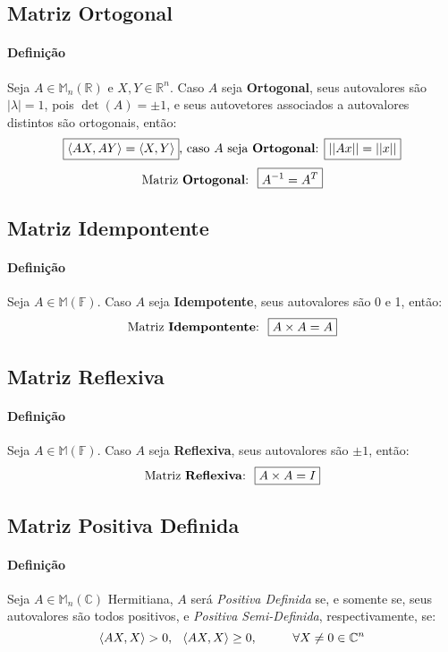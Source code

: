 \documentclass{article}
\begin{document}
        \subsection{Matriz Ortogonal}
            \paragraph{Definição}Seja $A\in\mathbb{M}_{n}(\mathbb{R})$ e $X, Y \in\mathbb{R}^{n}$. Caso $A$ seja \textbf{Ortogonal}, seus autovalores são $|\lambda| = 1$, pois $\det(A) = \pm 1$, e seus autovetores associados a autovalores distintos são ortogonais, então:
            \[
                \boxed{\langle AX, AY \rangle = \langle X, Y \rangle} \text{, caso $A$ seja \textbf{Ortogonal}: }
                \boxed{||Ax|| = ||x||}
            \]
            \[\text{Matriz \textbf{Ortogonal}:} \hspace{2.5mm} \boxed{A^{-1} = A^{T}}\]

        \subsection{Matriz Idempontente}
            \paragraph{Definição}Seja $A\in\mathbb{M}(\mathbb{F})$. Caso $A$ seja \textbf{Idempotente}, seus autovalores são 0 e 1, então:
                \[\text{Matriz \textbf{Idempontente}:} \hspace{2.5mm} \boxed{A \times A = A}\]

        \subsection{Matriz Reflexiva}
            \paragraph{Definição}Seja $A\in\mathbb{M}(\mathbb{F})$. Caso $A$ seja \textbf{Reflexiva}, seus autovalores são $\pm 1$, então:
            \[\text{Matriz \textbf{Reflexiva}:} \hspace{2.5mm} \boxed{A \times A = I}\]

        \subsection{Matriz Positiva Definida}
            \paragraph{Definição}Seja $A\in\mathbb{M}_{n}(\mathbb{C})$ Hermitiana, $A$ será \textit{Positiva Definida} se, e somente se, seus autovalores são todos positivos, e \textit{Positiva Semi-Definida}, respectivamente, se:
                \[
                    \langle AX, X \rangle    > 0, \hspace{2.5mm}
                    \langle AX, X \rangle \geq 0, \hspace{10mm} \forall X\neq 0\in\mathbb{C}^{n}
                \]
\end{document}
